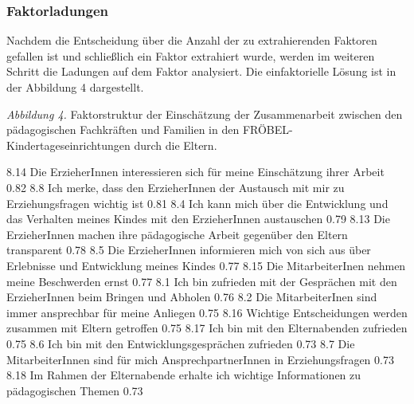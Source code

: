 \documentclass[12pt,a4paper]{article}
\begin{document}
\subsubsection{Faktorladungen}
Nachdem die Entscheidung über die Anzahl der zu extrahierenden Faktoren gefallen ist und schließlich ein Faktor extrahiert wurde, werden im weiteren Schritt die Ladungen auf dem Faktor analysiert. Die einfaktorielle Lösung ist in der Abbildung 4 dargestellt.

\textit{Abbildung 4.} Faktorstruktur der Einschätzung der Zusammenarbeit zwischen den pädagogischen Fachkräften und Familien in den FRÖBEL-Kinder\-tages\-ein\-rich\-tungen durch die Eltern.

8.14 Die ErzieherInnen interessieren sich für meine Einschätzung
        ihrer Arbeit                                                                                            0.82
8.8 Ich merke, dass den ErzieherInnen der Austausch mit mir zu
      Erziehungsfragen wichtig ist                                                                   0.81   
8.4 Ich kann mich über die Entwicklung und das Verhalten
      meines Kindes mit den ErzieherInnen austauschen                                0.79
8.13 Die ErzieherInnen machen ihre pädagogische Arbeit gegenüber
        den Eltern transparent                                                                            0.78
8.5 Die ErzieherInnen informieren mich von sich aus über Erlebnisse
      und Entwicklung meines Kindes                                                             0.77
8.15 Die MitarbeiterInen nehmen meine Beschwerden ernst                        0.77
8.1 Ich bin zufrieden mit der Gesprächen mit den ErzieherInnen
      beim Bringen und Abholen	                                                               0.76
8.2 Die MitarbeiterInen sind immer ansprechbar für meine Anliegen           0.75
8.16 Wichtige Entscheidungen werden zusammen mit Eltern
        getroffen                                                                                                  0.75
8.17 Ich bin mit den Elternabenden zufrieden                                                0.75
8.6 Ich bin mit den Entwicklungsgesprächen zufrieden                                 0.73  
8.7 Die MitarbeiterInnen sind für mich AnsprechpartnerInnen in             
      Erziehungsfragen                                                                                       0.73
8.18 Im Rahmen der Elternabende erhalte ich wichtige Informationen
        zu pädagogischen Themen                                                                      0.73
\end{document}
